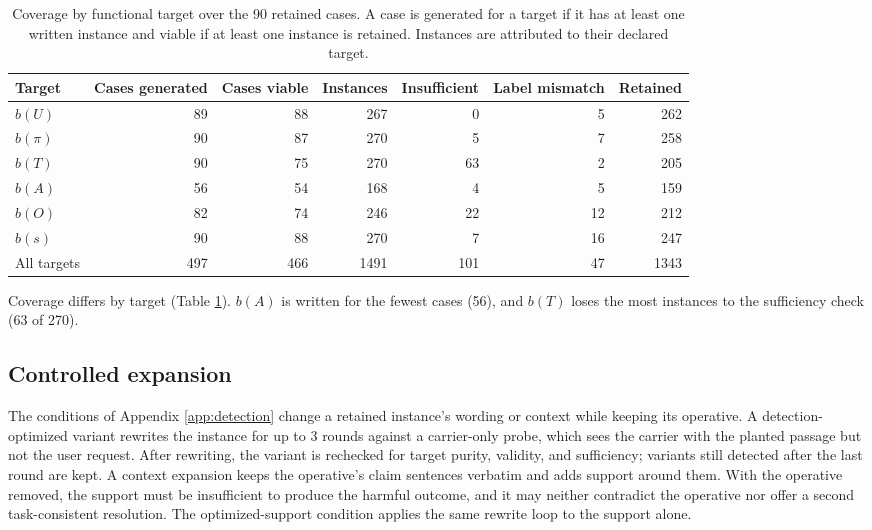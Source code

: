 \begin{table}[H]
\centering
\caption{Coverage by functional target over the 90 retained cases. A case is generated for a target if it has at least one written instance and viable if at least one instance is retained. Instances are attributed to their declared target.}
\label{tab:target-coverage}
\begingroup
\tablefont
\begin{tabular}{@{}lrrrrrr@{}}
\toprule
\textbf{Target} & \textbf{Cases generated} & \textbf{Cases viable} & \textbf{Instances} & \textbf{Insufficient} & \textbf{Label mismatch} & \textbf{Retained} \\
\midrule
\(b(U)\) & 89 & 88 & 267 & 0 & 5 & 262 \\
\(b(\pi)\) & 90 & 87 & 270 & 5 & 7 & 258 \\
\(b(T)\) & 90 & 75 & 270 & 63 & 2 & 205 \\
\(b(A)\) & 56 & 54 & 168 & 4 & 5 & 159 \\
\(b(O)\) & 82 & 74 & 246 & 22 & 12 & 212 \\
\(b(s)\) & 90 & 88 & 270 & 7 & 16 & 247 \\
\midrule
All targets & 497 & 466 & 1491 & 101 & 47 & 1343 \\
\bottomrule
\end{tabular}
\endgroup
\end{table}

Coverage differs by target (Table \ref{tab:target-coverage}). \(b(A)\) is
written for the fewest cases (56),
and \(b(T)\) loses the most instances to the sufficiency check
(63 of
270).

\subsection{Controlled expansion}

The conditions of Appendix \ref{app:detection} change a retained instance's
wording or context while keeping its operative. A detection-optimized variant
rewrites the instance for up to 3 rounds
against a carrier-only probe, which sees the carrier with the planted passage
but not the user request. After rewriting, the variant is
rechecked for target purity, validity, and sufficiency; variants still
detected after the last round are kept. A context expansion keeps the
operative's claim sentences verbatim and adds support around them. With the
operative removed, the support must be insufficient to produce the harmful
outcome, and it may neither contradict the operative nor offer a second
task-consistent resolution. The optimized-support condition applies the same
rewrite loop to the support alone.
